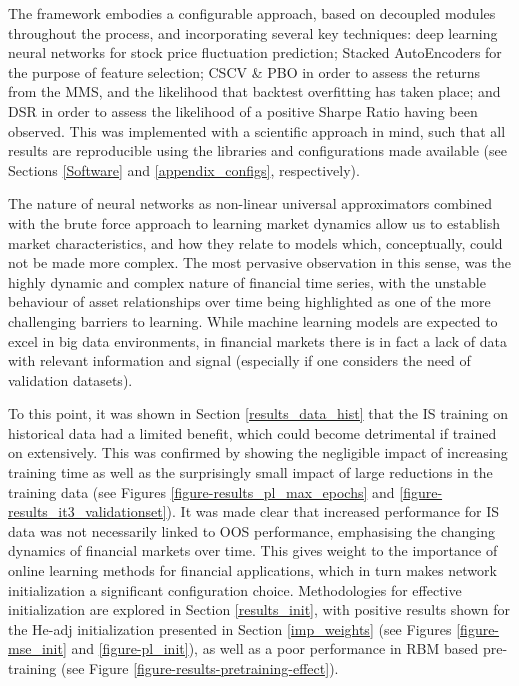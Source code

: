 \documentclass[a4paper,11pt,oneside]{article}
\theoremstyle{plain}
\theoremstyle{definition}
\begin{document}
	The framework embodies a configurable approach, based on decoupled modules throughout the process, and incorporating several key techniques: deep learning neural networks for stock price fluctuation prediction; Stacked AutoEncoders for the purpose of feature selection; CSCV \& PBO in order to assess the returns from the MMS, and the likelihood that backtest overfitting has taken place; and DSR in order to assess the likelihood of a positive Sharpe Ratio having been observed. This was implemented with a scientific approach in mind, such that all results are reproducible using the libraries and configurations made available (see Sections \ref{Software} and \ref{appendix_configs}, respectively). \newline 
	
	The nature of neural networks as non-linear universal approximators combined with the brute force approach to learning market dynamics allow us to establish market characteristics, and how they relate to models which, conceptually, could not be made more complex. The most pervasive observation in this sense, was the highly dynamic and complex nature of financial time series, with the unstable behaviour of asset relationships over time being highlighted as one of the more challenging barriers to learning. While machine learning models are expected to excel in big data environments, in financial markets there is in fact a lack of data with relevant information and signal (especially if one considers the need of validation datasets). \newline
	
	To this point, it was shown in Section \ref{results_data_hist} that the IS training on historical data had a limited benefit, which could become detrimental if trained on extensively. This was confirmed by showing the negligible impact of increasing training time as well as the surprisingly small impact of large reductions in the training data (see Figures \ref{figure-results_pl_max_epochs} and \ref{figure-results_it3_validationset}). It was made clear that increased performance for IS data was not necessarily linked to OOS performance, emphasising the changing dynamics of financial markets over time. This gives weight to the importance of online learning methods for financial applications, which in turn makes network initialization a significant configuration choice. Methodologies for effective initialization are explored in Section \ref{results_init}, with positive results shown for the He-adj initialization presented in Section \ref{imp_weights} (see Figures \ref{figure-mse_init} and \ref{figure-pl_init}), as well as a poor performance in RBM based pre-training (see Figure \ref{figure-results-pretraining-effect}).  \newline
	
\end{document}

